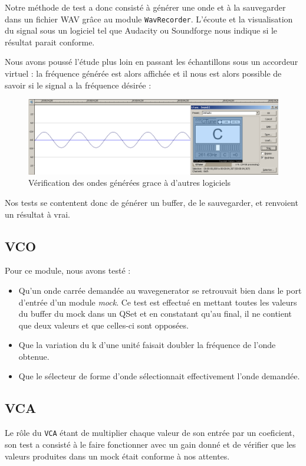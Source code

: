 Notre méthode de test a donc consisté à générer une onde et à la
sauvegarder dans un fichier WAV grâce au module \verb!WavRecorder!.
L'écoute et la visualisation du signal sous un logiciel tel que
Audacity ou Soundforge nous indique si le résultat parait
conforme.

Nous avons poussé l'étude plus loin en passant les échantillons
sous un accordeur virtuel : la fréquence générée est alors affichée
et il nous est alors possible de savoir si le signal a la fréquence
désirée :

\begin{figure}[htb]
\centering
\includegraphics[width=17cm]{../img/png/testWaveGeneratorSinus.png}
\caption{Vérification des ondes générées grace à d'autres logiciels}
\end{figure}

Nos tests se contentent donc de générer un buffer, de le
sauvegarder, et renvoient un résultat à vrai.

\subsection{VCO}
Pour ce module, nous avons testé :
\begin{itemize}
    \item Qu'un onde  carrée demandée au wavegenerator se retrouvait bien dans le port d'entrée d'un module \textit{mock}. Ce test est effectué en mettant toutes les valeurs du buffer du mock dans un QSet et en constatant qu'au final, il ne contient que deux valeurs et que celles-ci sont opposées.
    \item Que la variation du k d'une unité faisait doubler la fréquence de l'onde obtenue.
    \item Que le sélecteur de forme d'onde sélectionnait effectivement l'onde demandée.
\end{itemize}

\subsection{VCA}
Le rôle du \verb!VCA! étant de multiplier chaque valeur de son entrée par un coeficient, son test a consisté à le faire fonctionner avec un gain donné et de vérifier que les valeurs produites dans un mock était conforme à nos attentes.


